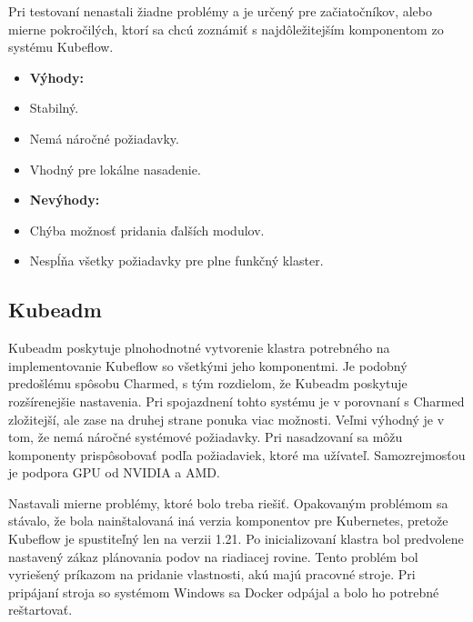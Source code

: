 Pri testovaní nenastali žiadne problémy a je určený pre začiatočníkov, alebo mierne pokročilých, ktorí sa chcú zoznámiť s najdôležitejším komponentom zo systému Kubeflow.
\newline
\newline
\begin{minipage}[t]{.45\textwidth}
    \begin{itemize}
        \item []\textbf{Výhody:}
        \item Stabilný.
	    \item Nemá náročné požiadavky.
        \item Vhodný pre lokálne nasadenie.
    \end{itemize}
\end{minipage}%
\begin{minipage}[t]{.55\textwidth}
    \begin{itemize}
        \item []\textbf{Nevýhody:}
        \item Chýba možnosť pridania ďalších modulov.
	    \item Nespĺňa všetky požiadavky pre plne funkčný klaster.
    \end{itemize}
\end{minipage}

\subsection*{Kubeadm}

Kubeadm poskytuje plnohodnotné vytvorenie klastra potrebného na implementovanie Kubeflow so všetkými jeho komponentmi. Je podobný predošlému spôsobu Charmed, s tým rozdielom, že Kubeadm poskytuje rozšírenejšie nastavenia. Pri spojazdnení tohto systému je v porovnaní s Charmed zložitejší, ale zase na druhej strane ponuka viac možnosti. Veľmi výhodný je v tom, že nemá náročné systémové požiadavky. Pri nasadzovaní sa môžu komponenty prispôsobovať podľa požiadaviek, ktoré ma užívateľ. Samozrejmosťou je podpora GPU od NVIDIA a AMD.

Nastavali mierne problémy, ktoré bolo treba riešiť. Opakovaným problémom sa stávalo, že bola nainštalovaná iná verzia komponentov pre Kubernetes, pretože Kubeflow je spustiteľný len na verzii 1.21. Po inicializovaní klastra bol predvolene nastavený zákaz plánovania podov na riadiacej rovine. Tento problém bol vyriešený príkazom na pridanie vlastnosti, akú majú pracovné stroje. Pri pripájaní stroja so systémom Windows sa Docker odpájal a bolo ho potrebné reštartovať.

